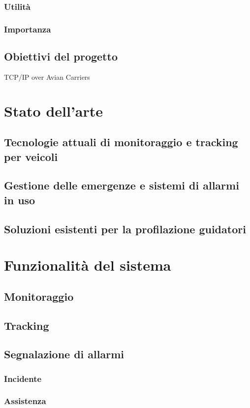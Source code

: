 \documentclass[12pt,a4paper]{report}
\begin{document}
\subsection{Utilità}
\subsection{Importanza}
\section{Obiettivi del progetto}

TCP/IP over Avian Carriers\cite{waitzman1990standard}

\chapter{Stato dell'arte}
\section{Tecnologie attuali di monitoraggio e tracking per veicoli}
\section{Gestione delle emergenze e sistemi di allarmi in uso}
\section{Soluzioni esistenti per la profilazione guidatori}

\chapter{Funzionalità del sistema}
\section{Monitoraggio}
\section{Tracking}
\section{Segnalazione di allarmi}
\subsection{Incidente}
\subsection{Assistenza}
\end{document}
